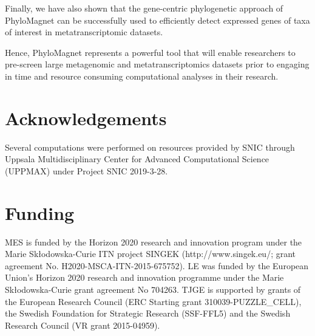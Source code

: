 \documentclass{bioinfo}
\begin{document}
Finally, we have also shown that the gene-centric phylogenetic approach of PhyloMagnet can be successfully used to efficiently detect expressed genes of taxa of interest in metatranscriptomic datasets. 

Hence, PhyloMagnet represents a powerful tool that will enable researchers to pre-screen large metagenomic and metatranscriptomics datasets prior to engaging in time and resource consuming computational analyses in their research.


\section*{Acknowledgements}
Several computations were performed on resources provided by SNIC through Uppsala Multidisciplinary Center for Advanced Computational Science (UPPMAX) under Project SNIC 2019-3-28.

\section*{Funding}
MES is funded by the Horizon 2020 research and innovation program under the Marie Sk\l{}odowska-Curie ITN project SINGEK (http://www.singek.eu/; grant agreement No. H2020-MSCA-ITN-2015-675752). LE was funded by the European Union’s Horizon 2020 research and innovation programme under the Marie Sk\l{}odowska-Curie grant agreement No 704263. TJGE is supported by grants of the European Research Council (ERC Starting grant 310039-PUZZLE\_CELL), the Swedish Foundation for Strategic Research (SSF-FFL5) and the Swedish Research Council (VR grant 2015-04959).

%



\newpage

\renewcommand\thefigure{S\arabic{figure}}
\setcounter{figure}{0}    

\begin{figure}[!t]
\caption{}\label{fig:S1}
\end{figure}

\begin{figure}[!t]
\caption{}\label{fig:S2}
\end{figure}

\begin{figure}[!t]
\caption{}\label{fig:S3}
\end{figure}

\begin{figure}[!t]
\caption{}\label{fig:S4}
\end{figure}
\renewcommand\thetable{S\arabic{table}}
\setcounter{table}{0}    

\begin{table}[!t]
\caption{}\label{tab:S1} 
\end{table}

\begin{table}[!t]
\caption{}\label{tab:S2} 
\end{table}
\end{document}
